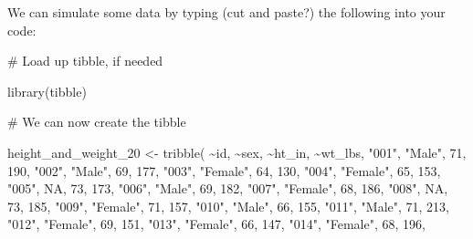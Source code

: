 \documentclass[
  letterpaper,
  DIV=11,
  numbers=noendperiod]{scrreprt}
\newenvironment{Shaded}{\begin{snugshade}}{\end{snugshade}}
\newcommand{\CommentTok}[1]{\textcolor[rgb]{0.37,0.37,0.37}{#1}}
\newcommand{\ConstantTok}[1]{\textcolor[rgb]{0.56,0.35,0.01}{#1}}
\newcommand{\DecValTok}[1]{\textcolor[rgb]{0.68,0.00,0.00}{#1}}
\newcommand{\FunctionTok}[1]{\textcolor[rgb]{0.28,0.35,0.67}{#1}}
\newcommand{\NormalTok}[1]{\textcolor[rgb]{0.00,0.23,0.31}{#1}}
\newcommand{\OtherTok}[1]{\textcolor[rgb]{0.00,0.23,0.31}{#1}}
\newcommand{\SpecialCharTok}[1]{\textcolor[rgb]{0.37,0.37,0.37}{#1}}
\newcommand{\StringTok}[1]{\textcolor[rgb]{0.13,0.47,0.30}{#1}}
\begin{document}
We can simulate some data by typing (cut and paste?) the following into
your code:

\begin{Shaded}
\begin{Highlighting}[]
\CommentTok{\# Load up tibble, if needed}

\FunctionTok{library}\NormalTok{(tibble)}

\CommentTok{\# We can now create the tibble}

\NormalTok{height\_and\_weight\_20 }\OtherTok{\textless{}{-}} \FunctionTok{tribble}\NormalTok{(}
  \SpecialCharTok{\textasciitilde{}}\NormalTok{id,   }\SpecialCharTok{\textasciitilde{}}\NormalTok{sex,     }\SpecialCharTok{\textasciitilde{}}\NormalTok{ht\_in, }\SpecialCharTok{\textasciitilde{}}\NormalTok{wt\_lbs,}
  \StringTok{"001"}\NormalTok{, }\StringTok{"Male"}\NormalTok{,   }\DecValTok{71}\NormalTok{,     }\DecValTok{190}\NormalTok{,}
  \StringTok{"002"}\NormalTok{, }\StringTok{"Male"}\NormalTok{,   }\DecValTok{69}\NormalTok{,     }\DecValTok{177}\NormalTok{,}
  \StringTok{"003"}\NormalTok{, }\StringTok{"Female"}\NormalTok{, }\DecValTok{64}\NormalTok{,     }\DecValTok{130}\NormalTok{,}
  \StringTok{"004"}\NormalTok{, }\StringTok{"Female"}\NormalTok{, }\DecValTok{65}\NormalTok{,     }\DecValTok{153}\NormalTok{,}
  \StringTok{"005"}\NormalTok{, }\ConstantTok{NA}\NormalTok{,       }\DecValTok{73}\NormalTok{,     }\DecValTok{173}\NormalTok{,}
  \StringTok{"006"}\NormalTok{, }\StringTok{"Male"}\NormalTok{,   }\DecValTok{69}\NormalTok{,     }\DecValTok{182}\NormalTok{,}
  \StringTok{"007"}\NormalTok{, }\StringTok{"Female"}\NormalTok{, }\DecValTok{68}\NormalTok{,     }\DecValTok{186}\NormalTok{,}
  \StringTok{"008"}\NormalTok{, }\ConstantTok{NA}\NormalTok{,       }\DecValTok{73}\NormalTok{,     }\DecValTok{185}\NormalTok{,}
  \StringTok{"009"}\NormalTok{, }\StringTok{"Female"}\NormalTok{, }\DecValTok{71}\NormalTok{,     }\DecValTok{157}\NormalTok{,}
  \StringTok{"010"}\NormalTok{, }\StringTok{"Male"}\NormalTok{,   }\DecValTok{66}\NormalTok{,     }\DecValTok{155}\NormalTok{,}
  \StringTok{"011"}\NormalTok{, }\StringTok{"Male"}\NormalTok{,   }\DecValTok{71}\NormalTok{,     }\DecValTok{213}\NormalTok{,}
  \StringTok{"012"}\NormalTok{, }\StringTok{"Female"}\NormalTok{, }\DecValTok{69}\NormalTok{,     }\DecValTok{151}\NormalTok{,}
  \StringTok{"013"}\NormalTok{, }\StringTok{"Female"}\NormalTok{, }\DecValTok{66}\NormalTok{,     }\DecValTok{147}\NormalTok{,}
  \StringTok{"014"}\NormalTok{, }\StringTok{"Female"}\NormalTok{, }\DecValTok{68}\NormalTok{,     }\DecValTok{196}\NormalTok{,}

\end{Highlighting}
\end{Shaded}
\end{document}
